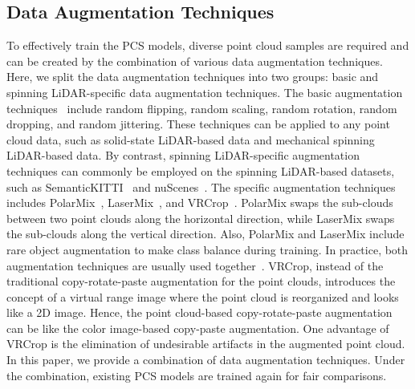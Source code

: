 \subsection{Data Augmentation Techniques}
To effectively train the PCS models, diverse point cloud samples are required and can be created by the combination of various data augmentation techniques. Here, we split the data augmentation techniques into two groups: basic and spinning LiDAR-specific data augmentation techniques. The basic augmentation techniques~\cite{data_aug2024} include random flipping, random scaling, random rotation, random dropping, and random jittering. These techniques can be applied to any point cloud data, such as solid-state LiDAR-based data and mechanical spinning LiDAR-based data. By contrast, spinning LiDAR-specific augmentation techniques can commonly be employed on the spinning LiDAR-based datasets, such as SemanticKITTI~\cite{semantickitti_2019_behley} and nuScenes~\cite{nuscenes_panoptic}. The specific augmentation techniques includes PolarMix~\cite{polarmix_2022}, LaserMix~\cite{lasermix_2023}, and VRCrop~\cite{pdm2024}. PolarMix swaps the sub-clouds between two point clouds along the horizontal direction, while LaserMix swaps the sub-clouds along the vertical direction. Also, PolarMix and LaserMix include rare object augmentation to make class balance during training. In practice, both augmentation techniques are usually used together~\cite{rangeformer_2023}. VRCrop, instead of the traditional copy-rotate-paste augmentation for the point clouds, introduces the concept of a virtual range image where the point cloud is reorganized and looks like a 2D image. Hence, the point cloud-based copy-rotate-paste augmentation can be like the color image-based copy-paste augmentation. One advantage of VRCrop is the elimination of undesirable artifacts in the augmented point cloud. In this paper, we provide a combination of data augmentation techniques. Under the combination, existing PCS models are trained again for fair comparisons.



